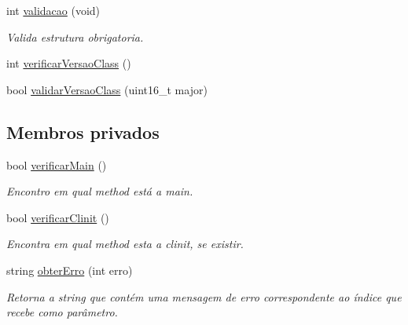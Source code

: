 \begin{DoxyCompactItemize}
int \hyperlink{classClassFile_acdb7018a6926b187bc6ecc18abf0fff8}{validacao} (void)
\begin{DoxyCompactList}\small\item\em Valida estrutura obrigatoria. \end{DoxyCompactList}\item 
int \hyperlink{classClassFile_a423be12c855bb2f0479ff83823973da3}{verificar\+Versao\+Class} ()
\item 
bool \hyperlink{classClassFile_a1dc8bb02efc19507cd93208d8477b436}{validar\+Versao\+Class} (uint16\+\_\+t major)
\end{DoxyCompactItemize}
\subsection*{Membros privados}
\begin{DoxyCompactItemize}
\item 
bool \hyperlink{classClassFile_ae8e4445e763c4ee7c04995fcea0369e0}{verificar\+Main} ()
\begin{DoxyCompactList}\small\item\em Encontro em qual method está a main. \end{DoxyCompactList}\item 
bool \hyperlink{classClassFile_ab0394185a299f35a9b5be68143385e84}{verificar\+Clinit} ()
\begin{DoxyCompactList}\small\item\em Encontra em qual method esta a clinit, se existir. \end{DoxyCompactList}\item 
string \hyperlink{classClassFile_a32767b8d966ef87249aa3a41ec5d67c3}{obter\+Erro} (int erro)
\begin{DoxyCompactList}\small\item\em Retorna a string que contém uma mensagem de erro correspondente ao índice que recebe como parâmetro. \end{DoxyCompactList}\end{DoxyCompactItemize}

